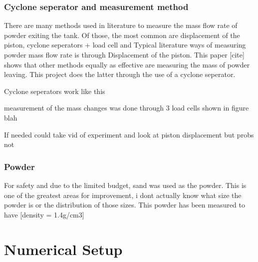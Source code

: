 \newpage


\newpage
\subsubsection{Cyclone seperator and measurement method}
There are many methods used in literature to measure the mass flow rate of powder exiting the tank. Of those, the most common are displacement of the piston, cyclone seperators + load cell and 
Typical literature ways of measuring powder mass flow rate is through Displacement of the piston. This paper [cite] shows that other methods equally as effective are measuring the mass of powder leaving. This project does the latter through the use of a cyclone seperator.

Cyclone seperators work like this

measurement of the mass changes was done through 3 load cells shown in figure blah

If needed could take vid of experiment and look at piston displacement but probs not


\subsubsection{Powder}
For safety and due to the limited budget, sand was used as the powder. This is one of the greatest areas for improvement, i dont actually know what size the powder is or the distribution of those sizes. This powder has been measured to have [density = 1.4g/cm3]

\newpage
\section{Numerical Setup}\label{sec:numerical-setup}
